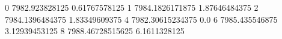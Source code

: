 0 7982.923828125 0.61767578125
1 7984.1826171875 1.87646484375
2 7984.1396484375 1.83349609375
4 7982.30615234375 0.0
6 7985.435546875 3.12939453125
8 7988.46728515625 6.1611328125
